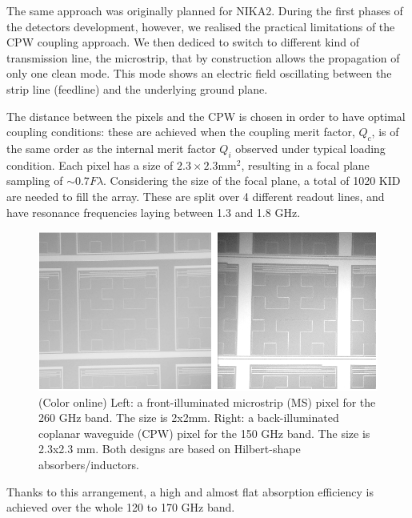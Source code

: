\documentclass[]{aa} %
\begin{document}
The same approach was originally planned for NIKA2. During the first phases of the detectors development, however, we realised the practical limitations of the CPW coupling approach. We then dediced to switch to different kind of transmission line, the microstrip, that by construction allows the propagation of only one clean mode. This mode shows an electric field oscillating between the strip line (feedline) and the underlying ground plane. 

The distance between the pixels and the CPW is chosen in order to have optimal coupling conditions: these are achieved when the coupling merit factor, $Q_c$, is of the same order as the internal merit factor $Q_i$ observed under typical loading condition. Each pixel has a size of $2.3\times2.3\textrm{mm}^2$, resulting in a focal plane sampling of $\sim 0.7 F\lambda$. Considering the size of the focal plane, a total of 1020 KID are needed to fill the array. These are split over 4 different readout lines, and have resonance frequencies laying between 1.3 and 1.8 GHz.

\begin{figure}[h]
   \centering
    \includegraphics[width=.95\linewidth]{CPWeMS.png}
      \caption{(Color online) Left: a front-illuminated microstrip (MS) pixel for the 260 GHz band. The size is 2x2mm. Right: a back-illuminated coplanar waveguide (CPW) pixel for the 150 GHz band. The size is 2.3x2.3 mm. Both designs are based on Hilbert-shape absorbers/inductors.}
         \label{Pixels}
\end{figure}


Thanks to this arrangement, a high and almost flat absorption efficiency is achieved over the whole 120 to 170 GHz band.
\end{document}
